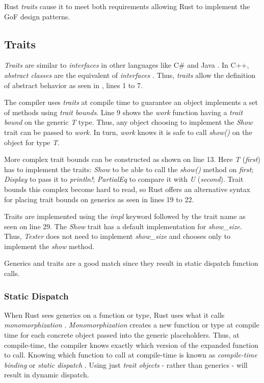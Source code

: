 Rust \textit{traits} cause it to meet both requirements allowing Rust to implement the GoF design patterns.

\subsection{Traits}
\textit{Traits} are similar \cite{klabnik_2019_01} to \textit{interfaces} in other languages like C\# \cite{robinson_04_01} and Java \cite{gosling_96_01}.
In C++, \textit{abstract classes} are the equivalent of \textit{interfaces} \cite{malik_09_01,stroustrup_13_01,alexandrescu_01_01}.
Thus, \textit{traits} allow the definition of abstract behavior as seen in , lines 1 to 7.


The compiler uses \textit{traits} at compile time to guarantee an object implements a set of methods using \textit{trait bounds}.
Line 9 shows the \textit{work} function having a \textit{trait bound} on the generic \textit{T} type.
Thus, any object choosing to implement the \textit{Show} trait can be passed to \textit{work}.
In turn, \textit{work} knows it is safe to call \textit{show()} on the object for type \textit{T}.

More complex trait bounds can be constructed as shown on line 13.
Here \textit{T} (\textit{first}) has to implement the traits: \textit{Show} to be able to call the \textit{show()} method on \textit{first}; \textit{Display} to pass it to \textit{println!}; \textit{PartialEq} to compare it with \textit{U} (\textit{second}).
Trait bounds this complex become hard to read, so Rust offers an alternative syntax for placing trait bounds on generics as seen in lines 19 to 22.

Traits are implemented using the \textit{impl} keyword followed by the trait name as seen on line 29.
The \textit{Show} trait has a default implementation for \textit{show\_size}.
Thus, \textit{Tester} does not need to implement \textit{show\_size} and chooses only to implement the \textit{show} method.

Generics and traits are a good match since they result in static dispatch function calls.

\subsubsection{Static Dispatch}
When Rust sees generics on a function or type, Rust uses what it calls \textit{monomorphization} \cite{klabnik_2019_01}.
\textit{Monomorphization} creates a new function or type at compile time for each concrete object passed into the generic placeholders.
Thus, at compile-time, the compiler knows exactly which version of the expanded function to call.
Knowing which function to call at compile-time is known as \textit{compile-time binding} \cite{malik_09_01} or \textit{static dispatch} \cite{klabnik_2019_01, alexandrescu_01_01}.
Using just \textit{trait objects} - rather than generics - will result in dynamic dispatch.

